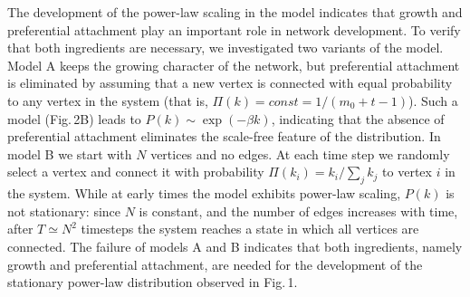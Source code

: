 The development of the power-law scaling in the model indicates that growth and preferential attachment play an important role in network development. To verify that both ingredients are necessary, we investigated two variants of the model.  Model A  keeps the growing character of the network, but preferential attachment is eliminated by assuming that a new vertex is connected with equal probability to any vertex in the system (that is, $\Pi(k)=const=1/(m_0+t-1)$). Such a model (Fig.$\,$2B) leads to $P(k)\sim \exp(-\beta k)$, indicating that the absence of preferential attachment eliminates the scale-free feature of the distribution. In model B we start with $N$ vertices and no edges. At each time step we randomly select a vertex and connect it with probability $\Pi(k_i)=k_i/\sum_j k_j$ to vertex $i$ in the system. While at early times the model exhibits power-law scaling, $P(k)$ is not stationary: since $N$ is constant, and the number of edges increases with time, after $T\simeq N^2$ timesteps the system reaches a  state in which all vertices are connected. The failure of models A and B indicates that both ingredients, namely growth and preferential attachment, are needed for the development of the stationary power-law distribution observed in Fig.$\,$1. 

